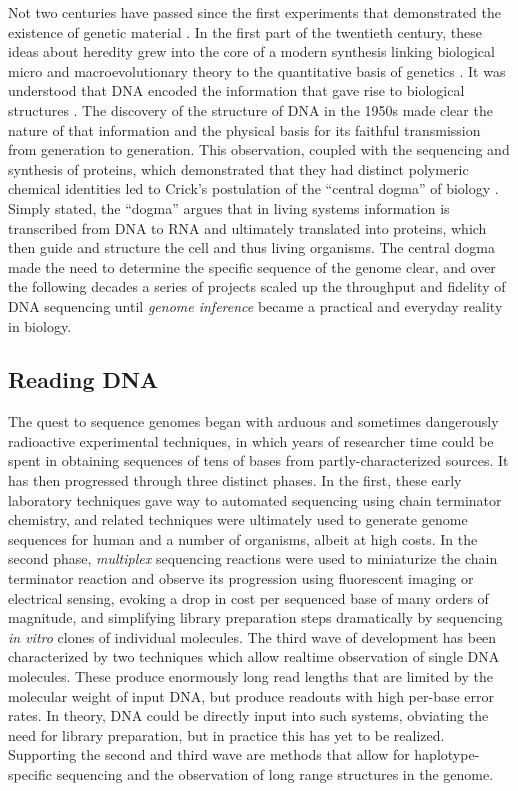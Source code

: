 Not two centuries have passed since the first experiments that demonstrated the existence of genetic material \cite{mendel1866versuche}.
In the first part of the twentieth century, these ideas about heredity grew into the core of a modern synthesis linking biological micro and macroevolutionary theory to the quantitative basis of genetics \cite{huxley1942evolution}.
It was understood that DNA encoded the information that gave rise to biological structures \cite{avery1944studies}.
The discovery of the structure of DNA in the 1950s \cite{watson1953molecular} made clear the nature of that information and the physical basis for its faithful transmission from generation to generation.
This observation, coupled with the sequencing and synthesis of proteins, which demonstrated that they had distinct polymeric chemical identities \cite{sanger1951amino} led to Crick's postulation of the ``central dogma'' of biology \cite{crick1958protein}.
Simply stated, the ``dogma'' argues that in living systems information is transcribed from DNA to RNA and ultimately translated into proteins, which then guide and structure the cell and thus living organisms.
The central dogma made the need to determine the specific sequence of the genome clear, and over the following decades a series of projects scaled up the throughput and fidelity of DNA sequencing until \emph{genome inference} became a practical and everyday reality in biology.

\subsection{Reading DNA}

The quest to sequence genomes began with arduous and sometimes dangerously radioactive experimental techniques, in which years of researcher time could be spent in obtaining sequences of tens of bases from partly-characterized sources.
It has then progressed through three distinct phases.
In the first, these early laboratory techniques gave way to automated sequencing using chain terminator chemistry, and related techniques were ultimately used to generate genome sequences for human and a number of organisms, albeit at high costs.
In the second phase, \emph{multiplex} sequencing reactions were used to miniaturize the chain terminator reaction and observe its progression using fluorescent imaging or electrical sensing, evoking a drop in cost per sequenced base of many orders of magnitude, and simplifying library preparation steps dramatically by sequencing \emph{in vitro} clones of individual molecules.
The third wave of development has been characterized by two techniques which allow realtime observation of single DNA molecules.
These produce enormously long read lengths that are limited by the molecular weight of input DNA, but produce readouts with high per-base error rates.
In theory, DNA could be directly input into such systems, obviating the need for library preparation, but in practice this has yet to be realized.
Supporting the second and third wave are methods that allow for haplotype-specific sequencing and the observation of long range structures in the genome.

